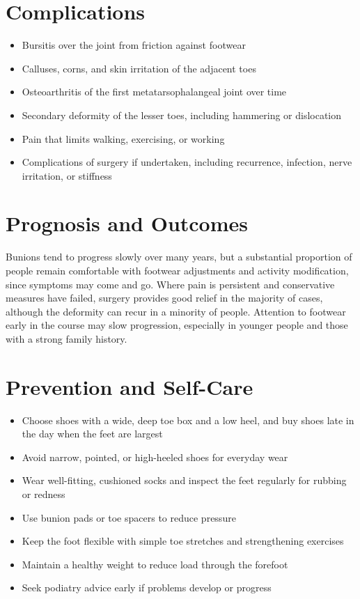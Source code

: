 \section*{Complications}
\begin{itemize}
    \item Bursitis over the joint from friction against footwear
    \item Calluses, corns, and skin irritation of the adjacent toes
    \item Osteoarthritis of the first metatarsophalangeal joint over time
    \item Secondary deformity of the lesser toes, including hammering or dislocation
    \item Pain that limits walking, exercising, or working
    \item Complications of surgery if undertaken, including recurrence, infection, nerve irritation, or stiffness
\end{itemize}

\section*{Prognosis and Outcomes}
Bunions tend to progress slowly over many years, but a substantial proportion of people remain comfortable with footwear adjustments and activity modification, since symptoms may come and go. Where pain is persistent and conservative measures have failed, surgery provides good relief in the majority of cases, although the deformity can recur in a minority of people. Attention to footwear early in the course may slow progression, especially in younger people and those with a strong family history.

\section*{Prevention and Self-Care}
\begin{itemize}
    \item Choose shoes with a wide, deep toe box and a low heel, and buy shoes late in the day when the feet are largest
    \item Avoid narrow, pointed, or high-heeled shoes for everyday wear
    \item Wear well-fitting, cushioned socks and inspect the feet regularly for rubbing or redness
    \item Use bunion pads or toe spacers to reduce pressure
    \item Keep the foot flexible with simple toe stretches and strengthening exercises
    \item Maintain a healthy weight to reduce load through the forefoot
    \item Seek podiatry advice early if problems develop or progress
\end{itemize}

